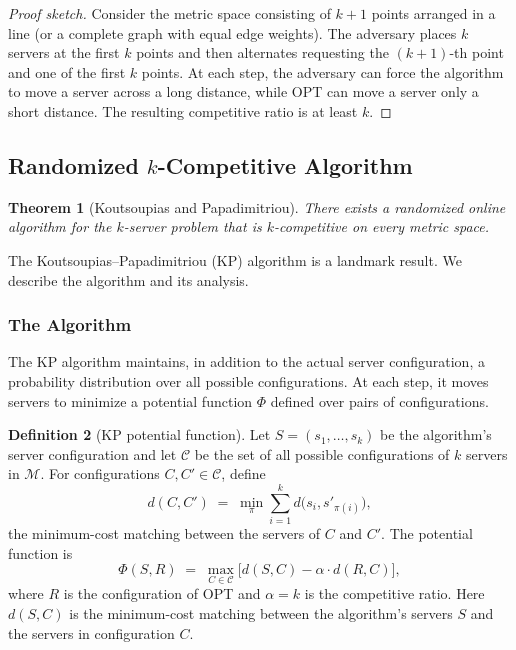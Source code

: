 \documentclass[twoside,12pt]{book}
\theoremstyle{plain}
\newtheorem{theorem}{Theorem}[chapter]
\theoremstyle{definition}
\newtheorem{definition}[theorem]{Definition}
\theoremstyle{remark}
\begin{document}
\begin{proof}[Proof sketch]
Consider the metric space consisting of $k+1$ points arranged in a
line (or a complete graph with equal edge weights).  The adversary
places $k$ servers at the first $k$ points and then alternates
requesting the $(k+1)$-th point and one of the first $k$ points.  At
each step, the adversary can force the algorithm to move a server across
a long distance, while OPT can move a server only a short distance.
The resulting competitive ratio is at least $k$.
\end{proof}

\subsection{Randomized \texorpdfstring{$k$}{k}-Competitive Algorithm}

\begin{theorem}[Koutsoupias and Papadimitriou]\label{thm:k-server-kp}
There exists a randomized online algorithm for the $k$-server problem
that is $k$-competitive on every metric space.
\end{theorem}

The Koutsoupias--Papadimitriou (KP) algorithm is a landmark result.  We
describe the algorithm and its analysis.

\subsubsection{The Algorithm}

The KP algorithm maintains, in addition to the actual server
configuration, a probability distribution over all possible
configurations.  At each step, it moves servers to minimize a potential
function $\Phi$ defined over pairs of configurations.

\begin{definition}[KP potential function]\label{def:kp-potential}
Let $S = (s_1, \ldots, s_k)$ be the algorithm's server configuration
and let $\mathcal{C}$ be the set of all possible configurations of $k$
servers in $\mathcal{M}$.  For configurations $C, C' \in \mathcal{C}$,
define
\[
  d(C, C') \;=\; \min_{\pi} \sum_{i=1}^{k} d\bigl(s_i, s'_{\pi(i)}\bigr),
\]
the minimum-cost matching between the servers of $C$ and $C'$.  The
potential function is
\[
  \Phi(S, R) \;=\; \max_{C \in \mathcal{C}} \bigl[ d(S, C) - \alpha \cdot d(R, C) \bigr],
\]
where $R$ is the configuration of OPT and $\alpha = k$ is the
competitive ratio.  Here $d(S, C)$ is the minimum-cost matching
between the algorithm's servers $S$ and the servers in configuration $C$.
\end{definition}
\end{document}
